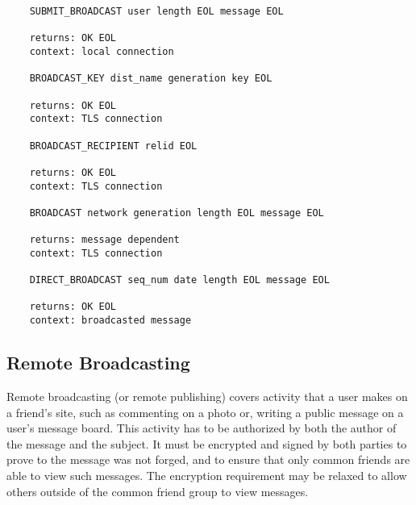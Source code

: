 \documentclass[letterpaper,11pt,oneside]{article}
\begin{document}
\vspace{10pt}
\begin{verbatim}
    SUBMIT_BROADCAST user length EOL message EOL

    returns: OK EOL
    context: local connection

    BROADCAST_KEY dist_name generation key EOL

    returns: OK EOL
    context: TLS connection

    BROADCAST_RECIPIENT relid EOL

    returns: OK EOL
    context: TLS connection

    BROADCAST network generation length EOL message EOL

    returns: message dependent
    context: TLS connection

    DIRECT_BROADCAST seq_num date length EOL message EOL

    returns: OK EOL
    context: broadcasted message
\end{verbatim}

\subsection{Remote Broadcasting}

Remote broadcasting (or remote publishing) covers activity that a user makes on
a friend's site, such as commenting on a photo or, writing a public message on
a user's message board. This activity has to be authorized by both the author
of the message and the subject. It must be encrypted and signed by both parties
to prove to the message was not forged, and to ensure that only common friends
are able to view such messages. The encryption requirement may be relaxed to
allow others outside of the common friend group to view messages.
\end{document}

